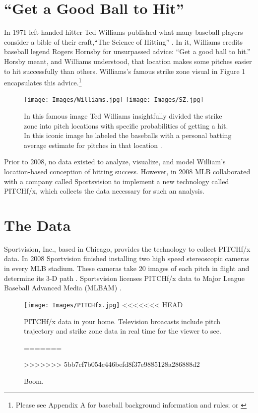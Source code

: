 \section{``Get a Good Ball to Hit''}
In 1971 left-handed hitter Ted Williams published what many baseball players consider a bible of their craft,``The Science of Hitting'' \citep{Williams1971}. In it, Williams credits baseball legend Rogers Hornsby for unsurpassed advice: ``Get a good ball to hit.'' Horsby meant, and Williams understood, that location makes some pitches easier to hit successfully than others. Williams's famous strike zone visual in Figure 1 encapsulates this advice.\footnote{Please see Appendix A for baseball background information and rules; or \citep{Wiki}}
        \begin{figure}[H]
      	\centering
      	\texttt{[image: Images/Williams.jpg]} 
      	\texttt{[image: Images/SZ.jpg]}
      	\caption{In this famous image Ted Williams insightfully divided the strike zone into pitch locations with specific probabilities of getting a hit. In this iconic image he labeled the baseballs with a personal batting average estimate for pitches in that location \citep{Williams1971}.}
      	\end{figure} 
Prior to 2008, no data existed to analyze, visualize, and model William's location-based conception of hitting success. However, in 2008 MLB collaborated with a company called Sportsvision to implement a new technology called PITCHf/x\textsuperscript{\textregistered}, which collects the  data necessary for such an analysis.

\section{The Data} %
Sportvision, Inc., based in Chicago, provides the technology to collect PITCHf/x\textsuperscript{\textregistered} data. In 2008 Sportvision finished installing two high speed stereoscopic cameras in every MLB\textsuperscript{\textregistered} stadium. These cameras take 20 images of each pitch in flight and determine its 3-D path \citep{Fast2010}. Sportsvision licenses PITCHf/x\textsuperscript{\textregistered} data to Major League Baseball Advanced Media (MLBAM\textsuperscript{\textregistered}) \citep{Baumer2010}. 

        \begin{figure}[H]
      	\centering
      	\texttt{[image: Images/PITCHfx.jpg]} 
<<<<<<< HEAD
      	\caption{PITCHf/x\textsuperscript{\textregistered} data in your home. Television broacasts include pitch trajectory and strike zone data in real time for the viewer to see.}
=======
      	\caption{Boom.}
>>>>>>> 5bb7cf7b054c446befd8f37e9885128a286888d2
      	\end{figure} 

